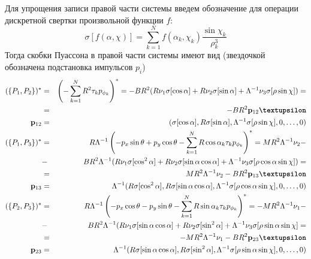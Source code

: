 Для упрощения записи правой части системы введем обозначение для операции дискретной свертки произвольной функции $f$:
$$
\sigma[f(\alpha,\chi)] = \sum\limits_{k=1}^{N} f(\alpha_k,\chi_k) \frac{\sin\chi_k}{\rho_k^3}
$$
Тогда скобки Пуассона в правой части системы имеют вид (звездочкой обозначена подстановка импульсов $p_i$)
\begin{eqnarray*}
(\{P_1,P_2\})^* &=& \left(-\sum\limits_{k=1}^{N} R^2\tau_kp_{\phi_k}\right)^* =
-BR^2(R\nu_1 \sigma[\cos\alpha] + R\nu_2 \sigma[\sin\alpha] + \Lambda^{-1}\nu_3\sigma[\rho\sin\chi]) = \\
&=& -BR^2\prhs_{12}\vnu\\
\prhs_{12} &=&
(\sigma[\cos\alpha], R\sigma[\sin\alpha], \Lambda^{-1}\sigma[\rho\sin\chi], 0,\dots,0)
\\
(\{P_1,P_3\})^* &=& {R}{\Lambda}^{-1}\left(-p_x\sin\theta + p_y\cos\theta - \sum\limits_{k=1}^{N} R\cos\alpha_k\tau_kp_{\phi_k}\right)^* = {MR^2}{\Lambda}^{-1}\nu_2 -\\
&-& {BR^2}{\Lambda}^{-1}(R\nu_1 \sigma[\cos^2\alpha] + R\nu_2 \sigma[\sin\alpha\cos\alpha] + \Lambda^{-1}\nu_3\sigma[\rho\cos\alpha\sin\chi])=\\
&=& {MR^2}{\Lambda}^{-1}\nu_2-{BR^2} \prhs_{13}\vnu\\
\prhs_{13} &=& \Lambda^{-1}
(R\sigma[\cos^2\alpha], R\sigma[\sin\alpha\cos\alpha], \Lambda^{-1}\sigma[\rho\cos\alpha\sin\chi], 0,\dots,0)
\\
(\{P_2,P_3\})^* &=& {R}{\Lambda}^{-1}\left(-p_x\cos\theta - p_y\sin\theta - \sum\limits_{k=1}^{N} R\sin\alpha_k\tau_kp_{\phi_k}\right)^*  = -{MR^2}{\Lambda}^{-1}\nu_1 -\\
&-& {BR^2}{\Lambda}^{-1}(R\nu_1\sigma[\sin\alpha\cos\alpha] + R\nu_2\sigma[\sin^2\alpha]+\Lambda^{-1}\nu_3\sigma[\rho\sin\alpha\sin\chi] =
\\
&=&-{MR^2}{\Lambda}^{-1}\nu_1 -{BR^2}\prhs_{23}\vnu\\
\prhs_{23} &=& \Lambda^{-1}
(R\sigma[\sin\alpha\cos\alpha], R\sigma[\sin^2\alpha], \Lambda^{-1}\sigma[\rho\sin\alpha\sin\chi], 0,\dots,0)
\end{eqnarray*}
